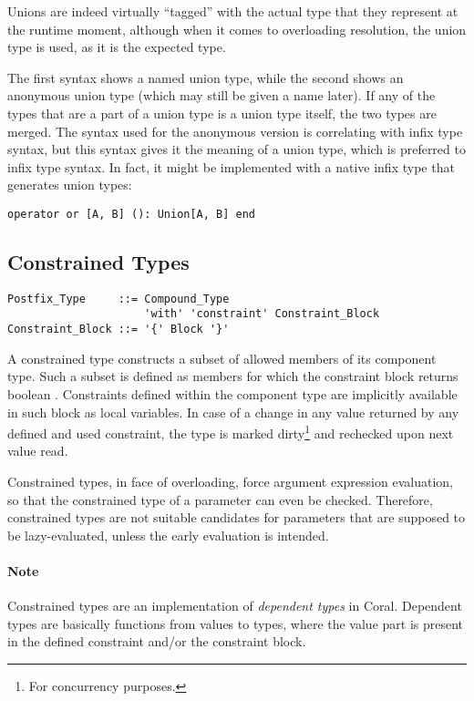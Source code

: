 Unions are indeed virtually ``tagged'' with the actual type that they represent at the runtime moment, although when it comes to overloading resolution, the union type is used, as it is the expected type. 

The first syntax shows a named union type, while the second shows an anonymous union type (which may still be given a name later). If any of the types that are a part of a union type is a union type itself, the two types are merged. The syntax used for the anonymous version is correlating with infix type syntax, but this syntax gives it the meaning of a union type, which is preferred to infix type syntax. In fact, it might be implemented with a native infix type that generates union types:

\begin{lstlisting}
operator or [A, B] (): Union[A, B] end
\end{lstlisting}





\subsection{Constrained Types}
\label{sec:constrained-types}

\syntax\begin{lstlisting}
Postfix_Type     ::= Compound_Type 
                     'with' 'constraint' Constraint_Block
Constraint_Block ::= '{' Block '}'
\end{lstlisting}

A constrained type constructs a subset of allowed members of its component type. Such a subset is defined as members for which the constraint block returns boolean . Constraints defined within the component type are implicitly available in such block as local variables. In case of a change in any value returned by any defined and used constraint, the type is marked dirty\footnote{For concurrency purposes.} and rechecked upon next value read. 

Constrained types, in face of overloading, force argument expression evaluation, so that the constrained type of a parameter can even be checked. Therefore, constrained types are not suitable candidates for parameters that are supposed to be lazy-evaluated, unless the early evaluation is intended. 

\paragraph{Note}
Constrained types are an implementation of {\em dependent types} in Coral. Dependent types are basically functions from values to types, where the value part is present in the defined constraint and/or the constraint block. 






